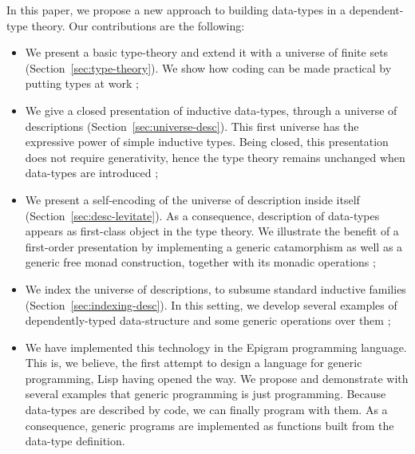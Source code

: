 \documentclass[preprint
              , authoryear
              ]{sigplanconf}
\begin{document}
In this paper, we propose a new approach to building data-types in a
dependent-type theory. Our contributions are the following:

\begin{itemize}
\item We present a basic type-theory and extend it with a universe of
  finite sets (Section~\ref{sec:type-theory}). We show how coding can
  be made practical by putting types at work ;
\item We give a closed presentation of inductive data-types, through a
  universe of descriptions (Section~\ref{sec:universe-desc}). This
  first universe has the expressive power of simple inductive
  types. Being closed, this presentation does not require
  generativity, hence the type theory remains unchanged when
  data-types are introduced ;
\item We present a self-encoding of the universe of description inside
  itself (Section~\ref{sec:desc-levitate}). As a consequence,
  description of data-types appears as first-class object in the type
  theory. We illustrate the benefit of a first-order presentation by
  implementing a generic catamorphism as well as a generic free monad
  construction, together with its monadic operations ;
\item We index the universe of descriptions, to subsume standard
  inductive families (Section~\ref{sec:indexing-desc}). In this
  setting, we develop several examples of dependently-typed
  data-structure and some generic operations over them ;
\item We have implemented this technology in the Epigram programming
  language. This is, we believe, the first attempt to design a
  language for generic programming, Lisp having opened the way. We
  propose and demonstrate with several examples that generic
  programming is just programming. Because data-types are described by
  code, we can finally program with them. As a consequence, generic
  programs are implemented as functions built from the data-type
  definition.
\end{itemize}




\end{document}
